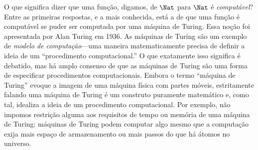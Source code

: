 \documentclass[../../../include/open-logic-section]{subfiles}
\begin{document}

O que significa dizer que uma função, digamos, de $\Nat$ para $\Nat$ é
\emph{computável}? Entre as primeiras respostas, e a mais conhecida,
está a de que uma função é computável se puder ser computada por uma
máquina de Turing. Essa noção foi apresentada por Alan Turing em 1936.
As máquinas de Turing são um exemplo de \emph{modelo de computação}---uma
maneira matematicamente precisa de definir a ideia de um
``procedimento computacional.'' O que exatamente isso significa é debatido, mas
há amplo consenso de que as máquinas de Turing são uma forma de especificar
procedimentos computacionais. Embora o termo ``máquina de Turing''
evoque a imagem de uma máquina física com partes móveis, estritamente
falando uma máquina de Turing é um construto puramente matemático e, como
tal, idealiza a ideia de um procedimento computacional. Por
exemplo, não impomos restrição alguma aos requisitos de tempo ou memória
de uma máquina de Turing: máquinas de Turing podem computar
algo mesmo que a computação exija mais espaço de armazenamento ou
mais passos do que há átomos no universo.
\end{document}

